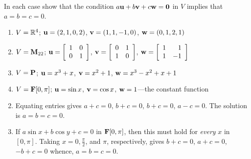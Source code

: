 \begin{multicols}{2}
\columnbreak 

\begin{ex}
In each case show that the condition $a\textbf{u} + b\textbf{v} + c\textbf{w} = \textbf{0}$ in $V$ implies that $a = b = c = 0$.


\begin{enumerate}[label={\alph*.}]
\item $V = \mathbb{R}^4$; $\textbf{u} = (2, 1, 0, 2)$, $\textbf{v} = (1, 1, -1, 0)$, $\textbf{w} = (0, 1, 2, 1)$

\item 
$ V = \textbf{M}_{22}$; $\textbf{u} = 
\left[ \begin{array}{rr}
1 & 0 \\
0 & 1
\end{array} \right]$, $\textbf{v} = 
\left[ \begin{array}{rr}
0 & 1 \\
1 & 0
\end{array} \right]$, \newline $\textbf{w} = 
\left[ \begin{array}{rr}
1 & 1 \\
1 & -1
\end{array} \right]$

\item $V = \textbf{P}$; $\textbf{u} = x^{3} + x$, $\textbf{v} = x^{2} + 1$, $\textbf{w} = x^{3} - x^{2} + x + 1$

\item $V = \textbf{F}[0, \pi]$; $\textbf{u} = \sin x$, $\textbf{v} = \cos x$, $\textbf{w} = 1$---the constant function

\end{enumerate}
\begin{sol}
\begin{enumerate}[label={\alph*.}]
\setcounter{enumi}{1}
\item  Equating entries gives $a + c = 0$, $b + c = 0$, $b + c = 0$, $a - c = 0$. The solution is $a = b = c = 0$.

\setcounter{enumi}{3}
\item  If $a \sin x + b \cos y + c = 0$ in $\textbf{F}[0, \pi]$, then this must hold for \textit{every} $x$ in $[0, \pi]$. Taking $x = 0, \frac{\pi}{2}$, and $\pi$, respectively, gives $b + c = 0$, $a + c = 0$, $-b + c = 0$ whence, $a = b = c = 0$.

\end{enumerate}
\end{sol}
\end{ex}


\end{multicols}
